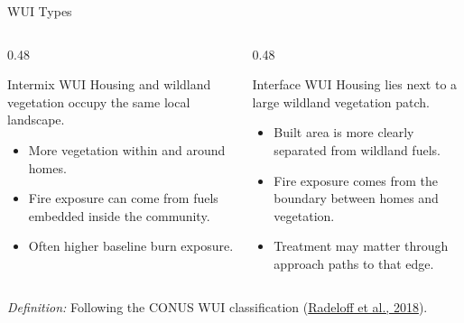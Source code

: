 \documentclass[10pt,aspectratio=169]{beamer}
\newcommand{\citelink}[2]{\textcolor{citationblue}{\hyperlink{#2}{#1}}}
\begin{document}
\begin{frame}{WUI Types}
  \begin{columns}[T,onlytextwidth]
    \begin{column}{0.48\textwidth}
      \begin{block}{Intermix WUI}
        Housing and wildland vegetation occupy the same local landscape.
      \end{block}
      \vspace{0.4em}
      \begin{itemize}
        \item More vegetation within and around homes.
        \item Fire exposure can come from fuels embedded inside the community.
        \item Often higher baseline burn exposure.
      \end{itemize}
    \end{column}
    \begin{column}{0.48\textwidth}
      \begin{block}{Interface WUI}
        Housing lies next to a large wildland vegetation patch.
      \end{block}
      \vspace{0.4em}
      \begin{itemize}
        \item Built area is more clearly separated from wildland fuels.
        \item Fire exposure comes from the boundary between homes and vegetation.
        \item Treatment may matter through approach paths to that edge.
      \end{itemize}
    \end{column}
  \end{columns}

  \vspace{0.8em}
  {\scriptsize \textit{Definition:} Following the CONUS WUI classification (\citelink{Radeloff et al., 2018}{ref:radeloff2018}).}
\end{frame}
\end{document}
